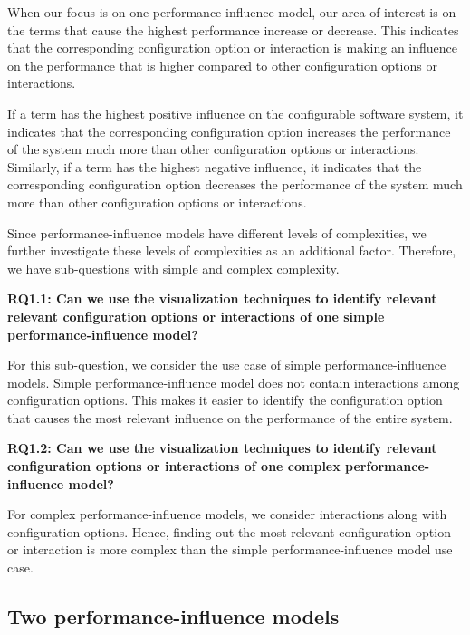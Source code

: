 When our focus is on one performance-influence model, our area of interest is on the terms that cause the highest performance increase or decrease. This indicates that the corresponding configuration option or interaction is making an influence on the performance that is higher compared to other configuration options or interactions.

If a term has the highest positive influence on the configurable software system, it indicates that the corresponding configuration option increases the performance of the system much more than other configuration options or interactions. Similarly, if a term has the highest negative influence, it indicates that the corresponding configuration option decreases the performance of the system much more than other configuration options or interactions.

Since performance-influence models have different levels of complexities, we further investigate these levels of complexities as an additional factor. Therefore, we have sub-questions with simple and complex complexity.

\begin{mdframed}
\textbf{RQ1.1: Can we use the visualization techniques to identify relevant relevant configuration options or interactions of one simple performance-influence model?}
\end{mdframed}

For this sub-question, we consider the use case of simple performance-influence models. Simple performance-influence model does not contain interactions among configuration options. This makes it easier to identify the configuration option that causes the most relevant influence on the performance of the entire system.

\begin{mdframed}
\textbf{RQ1.2: Can we use the visualization techniques to identify relevant configuration options or interactions of one complex performance-influence model?}
\end{mdframed}

For complex performance-influence models, we consider interactions along with configuration options. Hence, finding out the most relevant configuration option or interaction is more complex than the simple performance-influence model use case. 

\subsection{Two performance-influence models}

